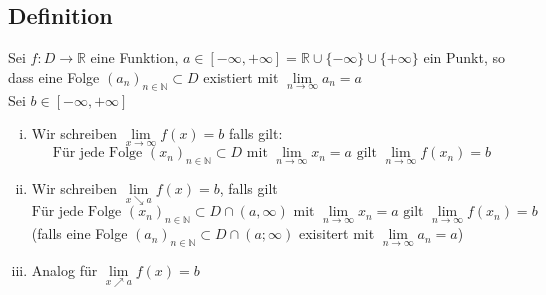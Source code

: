 \subsection{Definition} %
\label{sub:definition}
Sei $f: D \to \mathds{R}$ eine Funktion, $a \in [- \infty , + \infty] = \mathds{R} \cup \{ - \infty\} \cup \{ + \infty \}$ ein Punkt, so dass
eine Folge $(a_n)_{n \in \mathds{N}} \subset D$ existiert mit $\lim\limits_{n \to \infty} a_n = a$ \\
Sei $b \in [- \infty , + \infty]$
\begin{enumerate}[(i)]
	\item Wir schreiben $\lim\limits_{x \to \infty} f(x) = b$ falls gilt:
	\[
		\text{Für jede Folge } (x_n)_{n \in \mathds{N} } \subset D \text{ mit } \lim\limits_{n \to \infty} x_n = a \text{ gilt } \lim\limits_{n \to \infty} f(x_n)=b
	\]
	\item Wir schreiben $\lim\limits_{x \searrow a} f(x) =b $, falls gilt
	\[
		\text{Für jede Folge } (x_n)_{n \in \mathds{N}} \subset D \cap (a, \infty) \text{ mit } \lim\limits_{n \to \infty} x_n =a \text{ gilt } 
		\lim\limits_{n \to \infty} f(x_n)=b
	\]
	(falls eine Folge $(a_n)_{n \in \mathds{N}} \subset D \cap (a; \infty)$ exisitert mit $\lim\limits_{n \to \infty} a_n = a$)
	\item Analog für $\lim\limits_{x \nearrow a} f(x) = b $
\end{enumerate}

